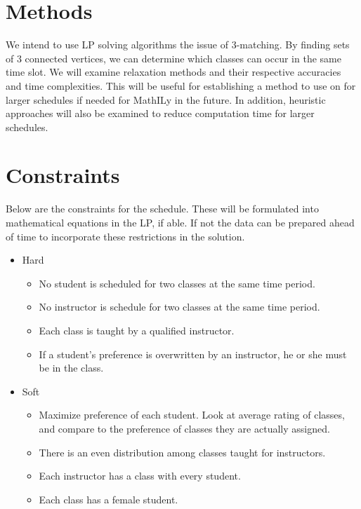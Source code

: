 \documentclass[11pt]{article}
\begin{document}
\section{Methods}

We intend to use LP solving algorithms the issue of 3-matching. By finding sets of 3 connected vertices, we can determine which classes can occur in the same time slot. We will examine relaxation methods and their respective accuracies and time complexities. This will be useful for establishing a method to use on for larger schedules if needed for MathILy in the future. In addition, heuristic approaches will also be examined to reduce computation time for larger schedules.

\section{Constraints}
Below are the constraints for the schedule. These will be formulated into mathematical equations in the LP, if able. If not the data can be prepared ahead of time to incorporate these restrictions in the solution.
\begin{itemize}
	\item Hard
	\begin{itemize}
		\item No student is scheduled for two classes at the same time period.
		\item No instructor is schedule for two classes at the same time period.
		\item Each class is taught by a qualified instructor.
		\item If a student's preference is overwritten by an instructor, he or she must be in the class.
	\end{itemize}
	\item Soft
	\begin{itemize}
	\item Maximize preference of each student. Look at average rating of classes, and compare to the preference of classes they are actually assigned.
	\item There is an even distribution among classes taught for instructors.
	\item Each instructor has a class with every student.
	\item Each class has a female student.
	\end{itemize}
\end{itemize}
\end{document}
